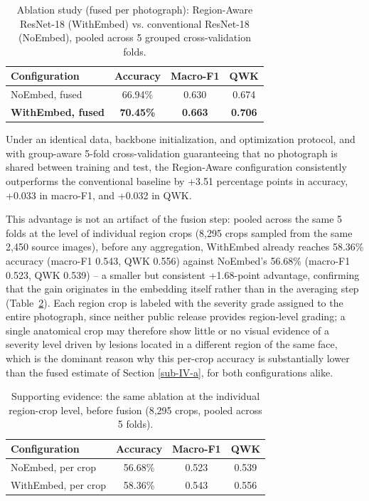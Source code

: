 \documentclass[conference]{IEEEtran}
\begin{document}
\begin{table}[H]
\caption{Ablation study (fused per photograph): Region-Aware ResNet-18 (WithEmbed) vs. conventional ResNet-18 (NoEmbed), pooled across 5 grouped cross-validation folds.}
\begin{center}
\small
\begin{tabular}{|l|c|c|c|}
\hline
\textbf{Configuration} & \textbf{Accuracy} & \textbf{Macro-F1} & \textbf{QWK} \\
\hline
NoEmbed, fused  & 66.94\% & 0.630 & 0.674 \\
\hline
\textbf{WithEmbed, fused} & \textbf{70.45\%} & \textbf{0.663} & \textbf{0.706} \\
\hline
\end{tabular}
\label{tab:ablation}
\end{center}
\end{table}

Under an identical data, backbone initialization, and optimization protocol, and with group-aware 5-fold cross-validation guaranteeing that no photograph is shared between training and test, the Region-Aware configuration consistently outperforms the conventional baseline by +3.51 percentage points in accuracy, +0.033 in macro-F1, and +0.032 in QWK.

This advantage is not an artifact of the fusion step: pooled across the same 5 folds at the level of individual region crops (8,295 crops sampled from the same 2,450 source images), before any aggregation, WithEmbed already reaches 58.36\% accuracy (macro-F1 0.543, QWK 0.556) against NoEmbed's 56.68\% (macro-F1 0.523, QWK 0.539) -- a smaller but consistent +1.68-point advantage, confirming that the gain originates in the embedding itself rather than in the averaging step (Table~\ref{tab:crop}). Each region crop is labeled with the severity grade assigned to the entire photograph, since neither public release provides region-level grading; a single anatomical crop may therefore show little or no visual evidence of a severity level driven by lesions located in a different region of the same face, which is the dominant reason why this per-crop accuracy is substantially lower than the fused estimate of Section \ref{sub-IV-a}, for both configurations alike.

\begin{table}[H]
\caption{Supporting evidence: the same ablation at the individual region-crop level, before fusion (8,295 crops, pooled across 5 folds).}
\begin{center}
\small
\begin{tabular}{|l|c|c|c|}
\hline
\textbf{Configuration} & \textbf{Accuracy} & \textbf{Macro-F1} & \textbf{QWK} \\
\hline
NoEmbed, per crop  & 56.68\% & 0.523 & 0.539 \\
\hline
WithEmbed, per crop & 58.36\% & 0.543 & 0.556 \\
\hline
\end{tabular}
\label{tab:crop}
\end{center}
\end{table}
\end{document}
